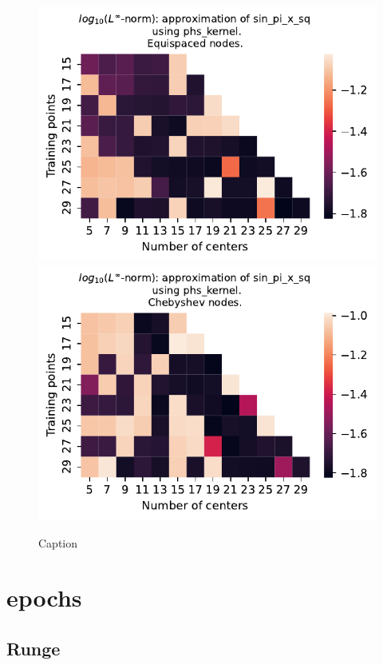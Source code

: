 \documentclass[12pt]{report} %
\begin{document}
\begin{figure}[ht]
  \centering

  \includegraphics[width=.49\textwidth]{imagenes/experiments/1d/variational/sin_pi_x_sq-Kphs_kernel-Equi.pdf}
  \includegraphics[width=.49\textwidth]{imagenes/experiments/1d/variational/sin_pi_x_sq-Kphs_kernel-Cheb.pdf}
  \caption{Caption}
  \label{fig:sin-pi-x-sq-phs}
\end{figure}

\section*{epochs}

\subsection*{Runge}
\end{document}
